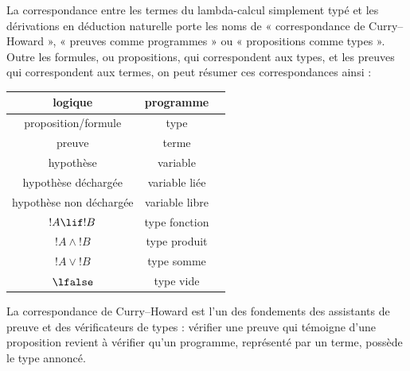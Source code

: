 \documentclass[../../../include/open-logic-section]{subfiles}
\begin{document}
La correspondance entre les termes du lambda-calcul simplement
typé et les dérivations en déduction naturelle porte les noms
de « correspondance de Curry--Howard », « preuves comme
programmes » ou « propositions comme types ».
Outre les formules, ou propositions, qui correspondent aux
types, et les preuves qui correspondent aux termes,
on peut résumer ces correspondances ainsi :
\begin{center}
  \begin{tabular}{c c c}
    logique & programme \\
    \hline
    proposition/formule & type \\
    preuve & terme \\
    hypothèse & variable \\
    hypothèse déchargée & variable liée \\
    hypothèse non déchargée & variable libre \\
    $!A \lif !B$ & type fonction \\
    $!A \land !B$ & type produit \\
    $!A \lor !B$ & type somme \\
    $\lfalse$ & type vide \\
    \hline
  \end{tabular}
\end{center}

La correspondance de Curry--Howard est l'un des fondements
des assistants de preuve et des vérificateurs de types :
vérifier une preuve qui témoigne d'une proposition revient
à vérifier qu'un programme, représenté par un terme,
possède le type annoncé.
\end{document}
